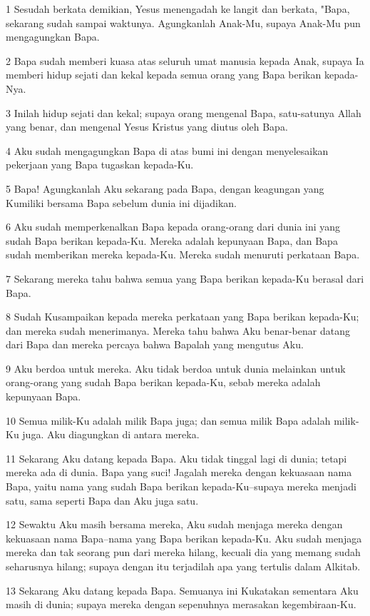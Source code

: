 \par 1 Sesudah berkata demikian, Yesus menengadah ke langit dan berkata, "Bapa, sekarang sudah sampai waktunya. Agungkanlah Anak-Mu, supaya Anak-Mu pun mengagungkan Bapa.
\par 2 Bapa sudah memberi kuasa atas seluruh umat manusia kepada Anak, supaya Ia memberi hidup sejati dan kekal kepada semua orang yang Bapa berikan kepada-Nya.
\par 3 Inilah hidup sejati dan kekal; supaya orang mengenal Bapa, satu-satunya Allah yang benar, dan mengenal Yesus Kristus yang diutus oleh Bapa.
\par 4 Aku sudah mengagungkan Bapa di atas bumi ini dengan menyelesaikan pekerjaan yang Bapa tugaskan kepada-Ku.
\par 5 Bapa! Agungkanlah Aku sekarang pada Bapa, dengan keagungan yang Kumiliki bersama Bapa sebelum dunia ini dijadikan.
\par 6 Aku sudah memperkenalkan Bapa kepada orang-orang dari dunia ini yang sudah Bapa berikan kepada-Ku. Mereka adalah kepunyaan Bapa, dan Bapa sudah memberikan mereka kepada-Ku. Mereka sudah menuruti perkataan Bapa.
\par 7 Sekarang mereka tahu bahwa semua yang Bapa berikan kepada-Ku berasal dari Bapa.
\par 8 Sudah Kusampaikan kepada mereka perkataan yang Bapa berikan kepada-Ku; dan mereka sudah menerimanya. Mereka tahu bahwa Aku benar-benar datang dari Bapa dan mereka percaya bahwa Bapalah yang mengutus Aku.
\par 9 Aku berdoa untuk mereka. Aku tidak berdoa untuk dunia melainkan untuk orang-orang yang sudah Bapa berikan kepada-Ku, sebab mereka adalah kepunyaan Bapa.
\par 10 Semua milik-Ku adalah milik Bapa juga; dan semua milik Bapa adalah milik-Ku juga. Aku diagungkan di antara mereka.
\par 11 Sekarang Aku datang kepada Bapa. Aku tidak tinggal lagi di dunia; tetapi mereka ada di dunia. Bapa yang suci! Jagalah mereka dengan kekuasaan nama Bapa, yaitu nama yang sudah Bapa berikan kepada-Ku--supaya mereka menjadi satu, sama seperti Bapa dan Aku juga satu.
\par 12 Sewaktu Aku masih bersama mereka, Aku sudah menjaga mereka dengan kekuasaan nama Bapa--nama yang Bapa berikan kepada-Ku. Aku sudah menjaga mereka dan tak seorang pun dari mereka hilang, kecuali dia yang memang sudah seharusnya hilang; supaya dengan itu terjadilah apa yang tertulis dalam Alkitab.
\par 13 Sekarang Aku datang kepada Bapa. Semuanya ini Kukatakan sementara Aku masih di dunia; supaya mereka dengan sepenuhnya merasakan kegembiraan-Ku.
